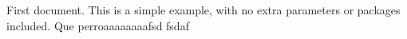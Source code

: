 \documentclass{article}
\begin{document}
First document. This is a simple example, with no extra parameters or packages included.
Que perroaaaaaaaafsd fsdaf 
\end{document}
